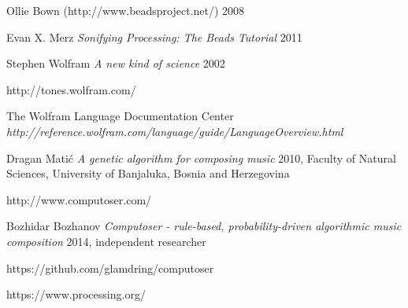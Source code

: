 \documentclass[12pt]{article}
\begin{document}
\begin{thebibliography}{1}

 Ollie Bown (http://www.beadsproject.net/) 2008

 Evan X. Merz {\em Sonifying Processing: The Beads Tutorial} 2011

 Stephen Wolfram {\em A new kind of science} 2002

 http://tones.wolfram.com/

 The Wolfram Language Documentation Center {\em http://reference.wolfram.com/language/guide/LanguageOverview.html}

 Dragan Mati\'c {\em A genetic algorithm for composing music} 2010, Faculty of Natural Sciences, University of Banjaluka, Bosnia and Herzegovina

 http://www.computoser.com/

 Bozhidar Bozhanov {\em Computoser - rule-based, probability-driven algorithmic music composition} 2014,  independent researcher

 https://github.com/glamdring/computoser

 https://www.processing.org/

\end{thebibliography}
\end{document}
